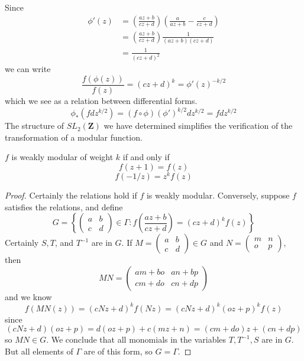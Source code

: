 Since
%
\begin{align*}
    \phi'(z) &= \left( \frac{az + b}{cz + d} \right) \left( \frac{a}{az + b} - \frac{c}{cz + d} \right)\\
    &= \left( \frac{az + b}{cz + d} \right) \frac{1}{(az + b)(cz + d)}\\
    &= \frac{1}{(cz + d)^2}
\end{align*}
%
we can write
%
\[ \frac{f(\phi(z))}{f(z)}  = (cz + d)^k = \phi'(z)^{-k/2} \]
%
which we see as a relation between differential forms.
%
\[ \phi_*(f dz^{k/2}) = (f \circ \phi) (\phi')^{k/2} dz^{k/2} = f dz^{k/2} \]
%
The structure of $SL_2(\mathbf{Z})$ we have determined simplifies the verification of the transformation of a modular function.

\begin{theorem}
    $f$ is weakly modular of weight $k$ if and only if
    \[ f(z + 1) = f(z) \]
    \[ f(-1/z) = z^k f(z) \]
\end{theorem}
\begin{proof}
    Certainly the relations hold if $f$ is weakly modular. Conversely, suppose $f$ satisfies the relations, and define
    \[ G = \left\{ \begin{pmatrix} a & b \\ c & d \end{pmatrix} \in \Gamma : f\left(\frac{az + b}{cz + d}\right) = (cz + d)^k f(z) \right\} \]
    Certainly $S, T$, and $T^{-1}$ are in $G$. If $M = \begin{pmatrix} a & b \\ c & d \end{pmatrix} \in G$ and $N = \begin{pmatrix} m & n \\ o & p \end{pmatrix}$, then
    \[ MN = \begin{pmatrix} am + bo & an + bp \\ cm + do & cn + dp \end{pmatrix} \]
    and we know
    \[ f\left( MN(z) \right) = (cNz + d)^k f(Nz) = (cNz + d)^k (oz + p)^k f(z) \]
    since
    \[ (cNz + d)(oz + p) = d(oz + p) + c(mz + n) = (cm + do)z + (cn + dp) \]
    so $MN \in G$. We conclude that all monomials in the variables $T, T^{-1}, S$ are in $G$. But all elements of $\Gamma$ are of this form, so $G = \Gamma$.
\end{proof}

